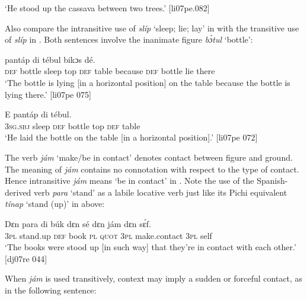 \glt ‘He stood up the cassava between two trees.’ [li07pe.082]
\z

Also compare the intransitive use of \textit{slíp} ‘sleep; lie; lay’ in  with the transitive use of \textit{slíp} in . Both sentences involve the inanimate figure \textit{bɔ́tul} ‘bottle’: 


\ea%
    \label{ex:key:946}
    \gll {}       pantáp  di  tébul  bikɔs        dé.\\
\textsc{def}  bottle  sleep  top    \textsc{def}  table  because  \textsc{def}  bottle  lie  there\\

\glt ‘The bottle is lying [in a horizontal position] on the table because the bottle is lying 
there.’ [li07pe 075]
\z


\ea%
    \label{ex:key:947}
    \gll E            pantáp  di  tébul.\\
\textsc{3sg.sbj}  sleep  \textsc{def}  bottle  top    \textsc{def}  table\\

\glt ‘He laid the bottle on the table [in a horizontal position].’ [li07pe 072]
\z

The verb \textit{jám} ‘make/be in contact’ denotes contact between figure and ground. The meaning of \textit{jám} contains no connotation with respect to the type of contact. Hence intransitive \textit{jám} means ‘be in contact’ in . Note the use of the Spanish-derived verb \textit{para} ‘stand’ as a labile locative verb just like its Pichi equivalent \textit{tínap} ‘stand (up)’ in  above:


\ea%
    \label{ex:key:948}
    \gll Dɛn  para  di  búk    dɛn  sé    dɛn  jám        dɛn  sɛ́f.\\
\textsc{3pl}  stand.up  \textsc{def}  book  \textsc{pl}  \textsc{quot}    \textsc{3pl}  make.contact    \textsc{3pl}  self\\

\glt ‘The books were stood up [in such way] that they’re in contact with each 
other.’ [dj07re 044]
\z

When \textit{jám} is used transitively, context may imply a sudden or forceful contact, as in the following sentence: 



